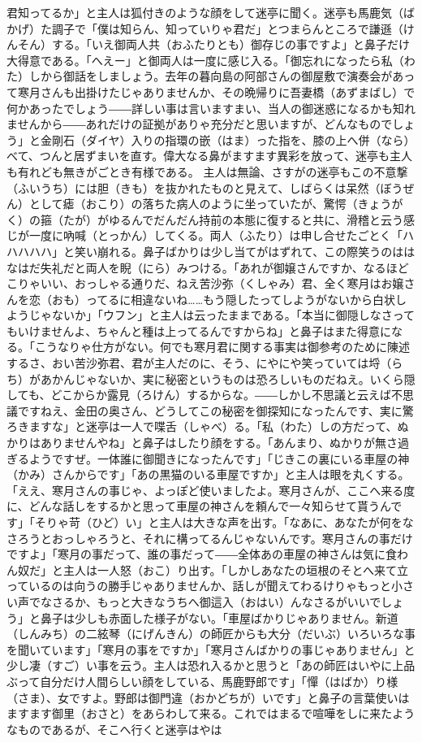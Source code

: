 \documentclass{book}
\begin{document}
君知ってるか」と主人は狐付きのような顔をして迷亭に聞く。迷亭も馬鹿気（ばかげ）た調子で「僕は知らん、知っていりゃ君だ」とつまらんところで謙遜（けんそん）する。「いえ御両人共（おふたりとも）御存じの事ですよ」と鼻子だけ大得意である。「へえー」と御両人は一度に感じ入る。「御忘れになったら私（わた）しから御話をしましょう。去年の暮向島の阿部さんの御屋敷で演奏会があって寒月さんも出掛けたじゃありませんか、その晩帰りに吾妻橋（あずまばし）で何かあったでしょう――詳しい事は言いますまい、当人の御迷惑になるかも知れませんから――あれだけの証拠がありゃ充分だと思いますが、どんなものでしょう」と金剛石（ダイヤ）入りの指環の嵌（はま）った指を、膝の上へ併（なら）べて、つんと居ずまいを直す。偉大なる鼻がますます異彩を放って、迷亭も主人も有れども無きがごとき有様である。
主人は無論、さすがの迷亭もこの不意撃（ふいうち）には胆（きも）を抜かれたものと見えて、しばらくは呆然（ぼうぜん）として瘧（おこり）の落ちた病人のように坐っていたが、驚愕（きょうがく）の箍（たが）がゆるんでだんだん持前の本態に復すると共に、滑稽と云う感じが一度に吶喊（とっかん）してくる。両人（ふたり）は申し合せたごとく「ハハハハハ」と笑い崩れる。鼻子ばかりは少し当てがはずれて、この際笑うのははなはだ失礼だと両人を睨（にら）みつける。「あれが御嬢さんですか、なるほどこりゃいい、おっしゃる通りだ、ねえ苦沙弥（くしゃみ）君、全く寒月はお嬢さんを恋（おも）ってるに相違ないね\ldots{}\ldots{}もう隠したってしようがないから白状しようじゃないか」「ウフン」と主人は云ったままである。「本当に御隠しなさってもいけませんよ、ちゃんと種は上ってるんですからね」と鼻子はまた得意になる。「こうなりゃ仕方がない。何でも寒月君に関する事実は御参考のために陳述するさ、おい苦沙弥君、君が主人だのに、そう、にやにや笑っていては埒（らち）があかんじゃないか、実に秘密というものは恐ろしいものだねえ。いくら隠しても、どこからか露見（ろけん）するからな。――しかし不思議と云えば不思議ですねえ、金田の奥さん、どうしてこの秘密を御探知になったんです、実に驚ろきますな」と迷亭は一人で喋舌（しゃべ）る。「私（わた）しの方だって、ぬかりはありませんやね」と鼻子はしたり顔をする。「あんまり、ぬかりが無さ過ぎるようですぜ。一体誰に御聞きになったんです」「じきこの裏にいる車屋の神（かみ）さんからです」「あの黒猫のいる車屋ですか」と主人は眼を丸くする。「ええ、寒月さんの事じゃ、よっぽど使いましたよ。寒月さんが、ここへ来る度に、どんな話しをするかと思って車屋の神さんを頼んで一々知らせて貰うんです」「そりゃ苛（ひど）い」と主人は大きな声を出す。「なあに、あなたが何をなさろうとおっしゃろうと、それに構ってるんじゃないんです。寒月さんの事だけですよ」「寒月の事だって、誰の事だって――全体あの車屋の神さんは気に食わん奴だ」と主人は一人怒（おこ）り出す。「しかしあなたの垣根のそとへ来て立っているのは向うの勝手じゃありませんか、話しが聞えてわるけりゃもっと小さい声でなさるか、もっと大きなうちへ御這入（おはい）んなさるがいいでしょう」と鼻子は少しも赤面した様子がない。「車屋ばかりじゃありません。新道（しんみち）の二絃琴（にげんきん）の師匠からも大分（だいぶ）いろいろな事を聞いています」「寒月の事をですか」「寒月さんばかりの事じゃありません」と少し凄（すご）い事を云う。主人は恐れ入るかと思うと「あの師匠はいやに上品ぶって自分だけ人間らしい顔をしている、馬鹿野郎です」「憚（はばか）り様（さま）、女ですよ。野郎は御門違（おかどちが）いです」と鼻子の言葉使いはますます御里（おさと）をあらわして来る。これではまるで喧嘩をしに来たようなものであるが、そこへ行くと迷亭はやは
\end{document}
